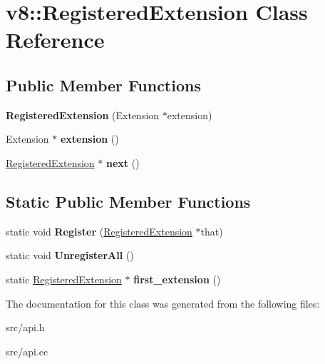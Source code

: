 \hypertarget{classv8_1_1_registered_extension}{}\section{v8\+:\+:Registered\+Extension Class Reference}
\label{classv8_1_1_registered_extension}
\subsection*{Public Member Functions}
\begin{DoxyCompactItemize}
\item 
\hypertarget{classv8_1_1_registered_extension_ae35b6424afab40f3949c99a407ee2836}{}{\bfseries Registered\+Extension} (Extension $\ast$extension)\label{classv8_1_1_registered_extension_ae35b6424afab40f3949c99a407ee2836}

\item 
\hypertarget{classv8_1_1_registered_extension_a84de5a581f562ad1b12f137471a42258}{}Extension $\ast$ {\bfseries extension} ()\label{classv8_1_1_registered_extension_a84de5a581f562ad1b12f137471a42258}

\item 
\hypertarget{classv8_1_1_registered_extension_a5863f0a2b1da0565c2baef1a0783d21a}{}\hyperlink{classv8_1_1_registered_extension}{Registered\+Extension} $\ast$ {\bfseries next} ()\label{classv8_1_1_registered_extension_a5863f0a2b1da0565c2baef1a0783d21a}

\end{DoxyCompactItemize}
\subsection*{Static Public Member Functions}
\begin{DoxyCompactItemize}
\item 
\hypertarget{classv8_1_1_registered_extension_a72fd9f2241a87703870e11c475c6f471}{}static void {\bfseries Register} (\hyperlink{classv8_1_1_registered_extension}{Registered\+Extension} $\ast$that)\label{classv8_1_1_registered_extension_a72fd9f2241a87703870e11c475c6f471}

\item 
\hypertarget{classv8_1_1_registered_extension_a77b6380f53298a8a5c22f9900d4bd194}{}static void {\bfseries Unregister\+All} ()\label{classv8_1_1_registered_extension_a77b6380f53298a8a5c22f9900d4bd194}

\item 
\hypertarget{classv8_1_1_registered_extension_afa3d987dc559af8c07555a817d907698}{}static \hyperlink{classv8_1_1_registered_extension}{Registered\+Extension} $\ast$ {\bfseries first\+\_\+extension} ()\label{classv8_1_1_registered_extension_afa3d987dc559af8c07555a817d907698}

\end{DoxyCompactItemize}


The documentation for this class was generated from the following files\+:\begin{DoxyCompactItemize}
\item 
src/api.\+h\item 
src/api.\+cc\end{DoxyCompactItemize}
